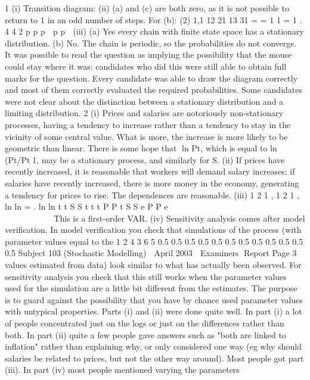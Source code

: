 \documentclass[a4paper,12pt]{article}
\begin{document}
\begin{enumerate}
1 (i) Transition diagram:
(ii) (a) and (c) are both zero, as it is not possible to return to 1 in an odd number of
steps.
For (b): (2)
1,1 12 21 13 31
= = 1 1 = 1 .
4 4 2
p p p  p p 
(iii) (a) Yes every chain with finite state space has a stationary distribution.
(b) No. The chain is periodic, so the probabilities do not converge.
It was possible to read the question as implying the possibility that the mouse could
stay where it was: candidates who did this were still able to obtain full marks for the
question.
Every candidate was able to draw the diagram correctly and most of them correctly
evaluated the required probabilities.
Some candidates were not clear about the distinction between a stationary
distribution and a limiting distribution.
2 (i) Prices and salaries are notoriously non-stationary processes, having a tendency
to increase rather than a tendency to stay in the vicinity of some central value.
What is more, the increase is more likely to be geometric than linear. There is
some hope that {ln Pt}, which is equal to {ln (Pt/Pt1}, may be a stationary
process, and similarly for S.
(ii) If prices have recently increased, it is reasonable that workers will demand
salary increases; if salaries have recently increased, there is more money in
the economy, generating a tendency for prices to rise. The dependences are
reasonable.
(iii) 1 2 1 ,
1 2 1 ,
ln ln
= .
ln ln
t t S S t
t t P P t
S S e
P P e


           
            
  
 	 	  
  
   
 
This is a first-order VAR.
(iv) Sensitivity analysis comes after model verification. In model verification you
check that simulations of the process (with parameter values equal to the
1 2 4
3 6 5
0.5 0.5
0.5 0.5
0.5
0.5 0.5 0.5
0.5 0.5
0.5 0.5
Subject 103 (Stochastic Modelling)  April 2003  Examiners Report
Page 3
values estimated from data) look similar to what has actually been observed.
For sensitivity analysis you check that this still works when the parameter
values used for the simulation are a little bit different from the estimates. The
purpose is to guard against the possibility that you have by chance used
parameter values with untypical properties.
Parts (i) and (ii) were done quite well. In part (i) a lot of people concentrated just on
the logs or just on the differences rather than both. In part (ii) quite a few people gave
answers such as "both are linked to inflation" rather than explaining why, or only
considered one way (eg why should salaries be related to prices, but not the other
way around).
Most people got part (iii). In part (iv) most people mentioned varying the parameters

\end{enumerate}
\end{document}
